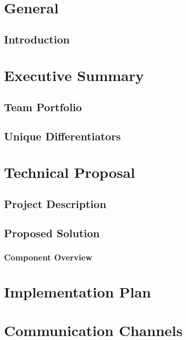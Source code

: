 \documentclass[a4paper]{article}
\begin{document}
	\section{General}
	
		\subsection{Introduction}
	
	\section{Executive Summary}
	
		\subsection{Team Portfolio}
		
		\subsection{Unique Differentiators}
		
	\section{Technical Proposal}
	
		\subsection{Project Description}
		
		\subsection{Proposed Solution}
		
			\subsubsection{Component Overview}
			
	\section{Implementation Plan}
	
	\section{Communication Channels}
\end{document}
